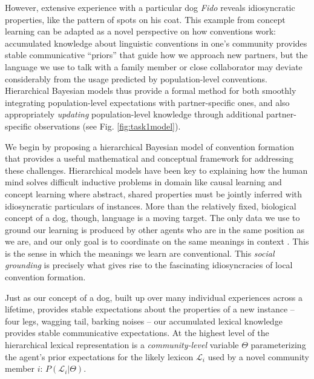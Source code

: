 However, extensive experience with a particular dog \emph{Fido} reveals idiosyncratic properties, like the pattern of spots on his coat.
This example from concept learning can be adapted as a novel perspective on how conventions work: accumulated knowledge about linguistic conventions in one's community provides stable communicative ``priors'' that guide how we approach new partners, but the language we use to talk with a family member or close collaborator may deviate considerably from the usage predicted by population-level conventions.
Hierarchical Bayesian models thus provide a formal method for both smoothly integrating population-level expectations with partner-specific ones, and also appropriately \emph{updating} population-level knowledge through additional partner-specific observations (see Fig. \ref{fig:task1model}).

We begin by proposing a hierarchical Bayesian model of convention formation \cite{GelmanEtAl14_BDA,TenenbaumKempGriffithsGoodman11_Grow_a_Mind_Science,KleinschmidtJaeger15_RobustSpeechPerception} that provides a useful mathematical and conceptual framework for addressing these challenges. Hierarchical models have been key to explaining how the human mind solves difficult inductive problems in domain like causal learning \cite{KempGoodmanTenenbaum10_LearningToLearn,GoodmanUllmanTenenbaum11_TheoryOfCausality} and concept learning \cite{KempPerforsTenenbaum07_HBM} where abstract, shared properties must be jointly inferred with idiosyncratic particulars of instances. More than the relatively fixed, biological concept of a dog, though, language is a moving target. The only data we use to ground our learning is produced by other agents who are in the same position as we are, and our only goal is to coordinate on the same meanings in context \cite{HassonGhazanfar___Keysers12BrainToBrain}. This is the sense in which the meanings we learn are conventional. This \emph{social grounding} is precisely what gives rise to the fascinating idiosyncracies of local convention formation.

Just as our concept of a dog, built up over many individual experiences across a lifetime, provides stable expectations about the properties of a new instance -- four legs, wagging tail, barking noises -- our accumulated lexical knowledge provides stable communicative expectations. 
At the highest level of the hierarchical lexical representation is a \emph{community-level} variable $\Theta$ parameterizing the agent's prior expectations for the likely lexicon $\mathcal{L}_i$ used by a novel community member $i$: $P(\mathcal{L}_i | \Theta)$. 

